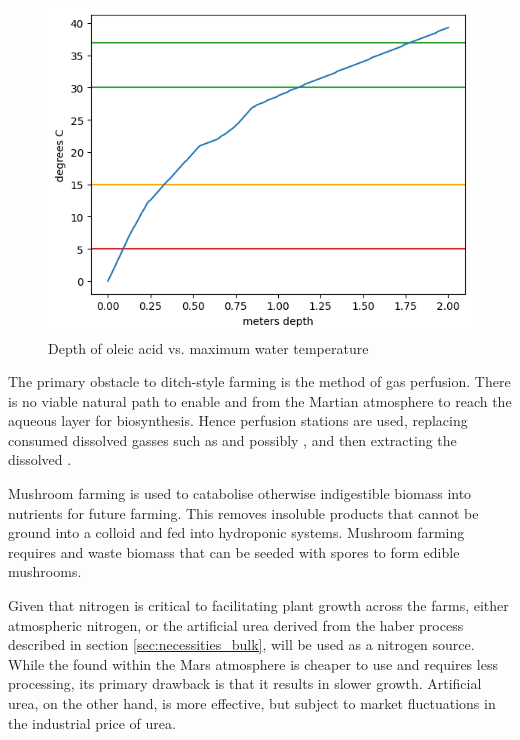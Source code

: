 \documentclass[fleqn,10pt]{Stylesheet} %
\begin{document}
\begin{figure}
    \centering
    \includegraphics[width=\linewidth]{figures/fig_bp.png}
    \caption{Depth of oleic acid vs. maximum water temperature}
    \label{fig:oleic_acid_bp}
\end{figure}

The primary obstacle to ditch-style farming is the method of gas perfusion. There is no viable natural path to enable  and  from the Martian atmosphere to reach the aqueous layer for biosynthesis. Hence perfusion stations are used, replacing consumed dissolved gasses such as  and possibly , and then extracting the dissolved . 

Mushroom farming is used to catabolise otherwise indigestible biomass into nutrients for future farming. This removes insoluble products that cannot be ground into a colloid and fed into hydroponic systems. Mushroom farming requires  and waste biomass that can be seeded with spores to form edible mushrooms.

Given that nitrogen is critical to facilitating plant growth across the farms, either atmospheric nitrogen, or the artificial urea derived from the haber process described in section \ref{sec:necessities_bulk}, will be used as a nitrogen source. While the  found within the Mars atmosphere is cheaper to use and requires less processing, its primary drawback is that it results in slower growth. Artificial urea, on the other hand, is more effective, but subject to market fluctuations in the industrial price of urea.
\end{document}
